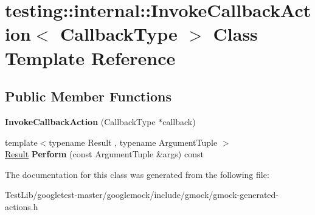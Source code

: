 \hypertarget{classtesting_1_1internal_1_1InvokeCallbackAction}{}\section{testing\+:\+:internal\+:\+:Invoke\+Callback\+Action$<$ Callback\+Type $>$ Class Template Reference}
\label{classtesting_1_1internal_1_1InvokeCallbackAction}
\subsection*{Public Member Functions}
\begin{DoxyCompactItemize}
\item 
\mbox{\label{classtesting_1_1internal_1_1InvokeCallbackAction_a21b051db0b2e1d33fd8d5cdfe7e6824b}} 
{\bfseries Invoke\+Callback\+Action} (Callback\+Type $\ast$callback)
\item 
\mbox{\label{classtesting_1_1internal_1_1InvokeCallbackAction_a74278acbfc51fe7407fdabc9d6a42c70}} 
{\footnotesize template$<$typename Result , typename Argument\+Tuple $>$ }\\\hyperlink{classResult}{Result} {\bfseries Perform} (const Argument\+Tuple \&args) const
\end{DoxyCompactItemize}


The documentation for this class was generated from the following file\+:\begin{DoxyCompactItemize}
\item 
Test\+Lib/googletest-\/master/googlemock/include/gmock/gmock-\/generated-\/actions.\+h\end{DoxyCompactItemize}
